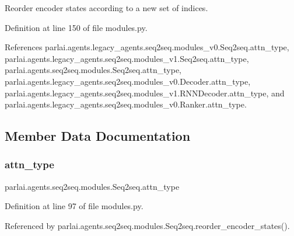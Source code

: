 \begin{DoxyVerb}Reorder encoder states according to a new set of indices.\end{DoxyVerb}
 

Definition at line 150 of file modules.\+py.



References parlai.\+agents.\+legacy\+\_\+agents.\+seq2seq.\+modules\+\_\+v0.\+Seq2seq.\+attn\+\_\+type, parlai.\+agents.\+legacy\+\_\+agents.\+seq2seq.\+modules\+\_\+v1.\+Seq2seq.\+attn\+\_\+type, parlai.\+agents.\+seq2seq.\+modules.\+Seq2seq.\+attn\+\_\+type, parlai.\+agents.\+legacy\+\_\+agents.\+seq2seq.\+modules\+\_\+v0.\+Decoder.\+attn\+\_\+type, parlai.\+agents.\+legacy\+\_\+agents.\+seq2seq.\+modules\+\_\+v1.\+R\+N\+N\+Decoder.\+attn\+\_\+type, and parlai.\+agents.\+legacy\+\_\+agents.\+seq2seq.\+modules\+\_\+v0.\+Ranker.\+attn\+\_\+type.



\subsection{Member Data Documentation}
\mbox{\label{classparlai_1_1agents_1_1seq2seq_1_1modules_1_1Seq2seq_a8337117b93156343eac3948bed19d6b0}} 
\subsubsection{\texorpdfstring{attn\+\_\+type}{attn\_type}}
{\footnotesize\ttfamily parlai.\+agents.\+seq2seq.\+modules.\+Seq2seq.\+attn\+\_\+type}



Definition at line 97 of file modules.\+py.



Referenced by parlai.\+agents.\+seq2seq.\+modules.\+Seq2seq.\+reorder\+\_\+encoder\+\_\+states().

\mbox{\label{classparlai_1_1agents_1_1seq2seq_1_1modules_1_1Seq2seq_a832563fd770ab89f2ff6a9ddf025b5c0}} 
